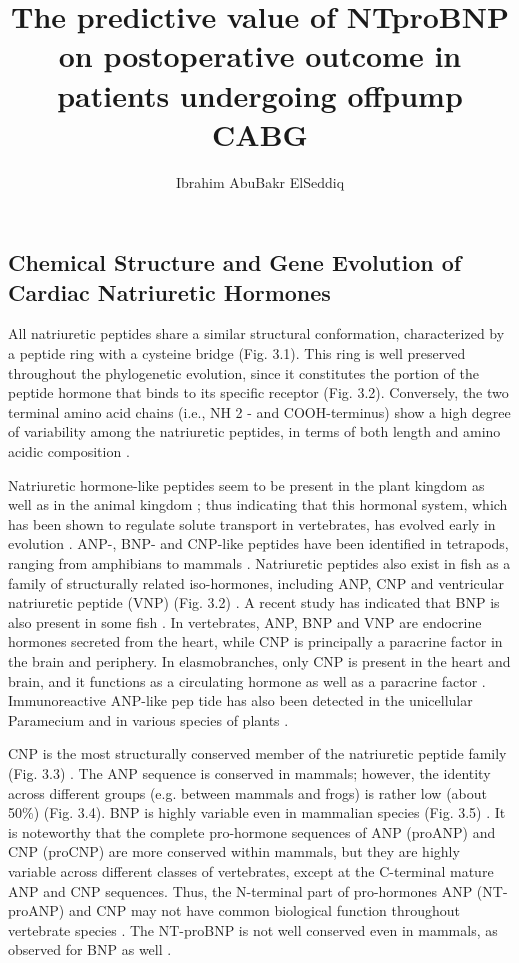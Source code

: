 \documentclass[14pt,a4paper,onecolumn]{extarticle}
\author{Ibrahim AbuBakr ElSeddiq}
\title{The predictive value of NTproBNP on postoperative outcome in patients undergoing offpump CABG}
\begin{document}
\maketitle
\clearpage



\subsection{Chemical Structure and Gene Evolution of Cardiac Natriuretic Hormones
}
All natriuretic peptides share a similar structural conformation, characterized by a peptide ring with a cysteine bridge (Fig. 3.1). This ring is well preserved throughout the phylogenetic evolution, since it constitutes the portion of the peptide hormone that binds to its specific receptor (Fig. 3.2). Conversely, the two terminal amino acid chains (i.e., NH 2 - and COOH-terminus) show a high degree of variability among the natriuretic peptides, in terms of both length and amino acidic composition \citep{1}.

Natriuretic hormone-like peptides seem to be present in the plant kingdom as well as in the animal kingdom \citep{1-3}; thus indicating that this hormonal system, which has been shown to regulate solute transport in vertebrates, has evolved early in evolution \citep{1-6}.  ANP-, BNP- and CNP-like peptides have been identified in tetrapods, ranging from amphibians to mammals \citep{1}. Natriuretic peptides also exist in fish as a family of structurally related iso-hormones, including ANP, CNP and ventricular natriuretic peptide (VNP) (Fig. 3.2) \citep{1}. A recent study has indicated that BNP is also present in some fish \citep{6}. In vertebrates, ANP, BNP and VNP are endocrine hormones secreted from the heart, while CNP is principally a paracrine factor in the brain and periphery. In elasmobranches, only CNP is present in the heart and brain, and it functions as a circulating hormone as well as a paracrine factor \citep{1}. Immunoreactive ANP-like pep tide has also been detected in the unicellular Paramecium and in various species of plants \citep{1}.

CNP is the most structurally conserved member of the natriuretic peptide family (Fig. 3.3) \citep{1}\citep{4}. The ANP sequence is conserved in mammals; however, the identity across different groups (e.g. between mammals and frogs) is rather low (about 50\%) (Fig. 3.4). BNP is highly variable even in mammalian species (Fig. 3.5) \citep{1}\citep{4}.  It is noteworthy that the complete pro-hormone sequences of ANP (proANP) and CNP (proCNP) are more conserved within mammals, but they are highly variable across different classes of vertebrates, except at the C-terminal mature ANP and CNP sequences.  Thus, the N-terminal part of pro-hormones ANP (NT-proANP) and CNP may not have common biological function throughout vertebrate species \citep{1}. The NT-proBNP is not well conserved even in mammals, as observed for BNP as well \citep{1}.
\end{document}
